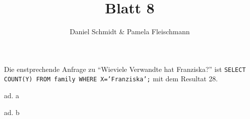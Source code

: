 \documentclass[12pt,a4paper]{amsart}
\begin{document}
\title{Blatt 8}

\author{Daniel Schmidt \& Pamela Fleischmann}

\maketitle

\begin{aufgabe1}


Die enstprechende Anfrage zu ``Wieviele Verwandte hat Franziska?'' ist \texttt{SELECT COUNT(Y) FROM family WHERE X='Franziska';} mit dem Resultat 28.
\end{aufgabe1}


\begin{aufgabe1}
ad. a



ad. b

\end{aufgabe1}

\begin{aufgabe1}
\end{aufgabe1}
\end{document}
